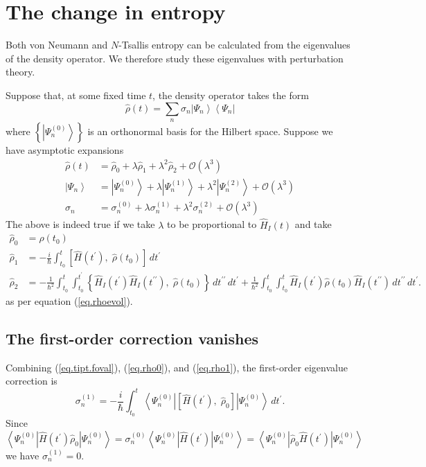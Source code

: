 \documentclass[11pt]{article}
\newcommand{\Od}[1]{\mathcal{O}{\left(#1\right)}}
\newcommand{\bra}[1]{\left\langle#1\right|}
\newcommand{\ket}[1]{\left|#1\right\rangle}
\newcommand{\op}[1]{\hat{#1}}
\theoremstyle{theorem}
\theoremstyle{remark}
\theoremstyle{step}
\theoremstyle{gap}
\begin{document}
\section{The change in entropy}

Both von Neumann and \(N\)-Tsallis entropy can be calculated from the eigenvalues of the density operator. We therefore study these eigenvalues with perturbation theory.

Suppose that, at some fixed time \(t\), the density operator takes the form
\begin{equation}\label{eq.densdecomp}
\op{\rho}(t) = \sum_n \sigma_n \ket{\Psi_n}\bra{\Psi_n}
\end{equation}
where \(\left\{\ket{\Psi_n^{(0)}}\right\}\) is an orthonormal basis for the Hilbert space.
Suppose we have asymptotic expansions
\begin{align*}
\op{\rho}(t) &= \op{\rho}_0 + \lambda \op{\rho}_1 + \lambda^2 \op{\rho}_2 + \Od{\lambda^3} \\
\ket{\Psi_n} &= \ket{\Psi_n^{(0)}} + \lambda \ket{\Psi_n^{(1)}} + \lambda^2 \ket{\Psi_n^{(2)}} + \Od{\lambda^3} \\
\sigma_n &= \sigma_n^{(0)} + \lambda \sigma_n^{(1)} + \lambda^2 \sigma_n^{(2)} + \Od{\lambda^3}
\end{align*}
The above is indeed true if we take \(\lambda\) to be proportional to \(\op{H}_I(t)\) and take
\begin{align}
\label{eq.rho0}\op{\rho}_0 &= \op{\rho}\left(t_0\right) \\
\label{eq.rho1}\op{\rho}_1 &= -\frac{i}{\hbar} \int_{t_0}^t \left[\op{H}(t^\prime),\; \op{\rho}(t_0) \right] \,dt^\prime\\
\label{eq.rho2}\op{\rho}_2 &= - \frac{1}{\hbar^2} \int_{t_0}^t \int_{t_0}^{t^\prime} \left\{ \op{H}_I (t^\prime) \op{H}_I(t^{\prime\prime}),\; \op{\rho}(t_0) \right\}\,dt^{\prime\prime}\,dt^\prime 
+ \frac{1}{\hbar^2} \int_{t_0}^t \int_{t_0}^{t} \op{H}_I (t^\prime) \op{\rho}(t_0) \op{H}_I (t^{\prime\prime})\,dt^{\prime\prime}\,dt^\prime.
\end{align}
as per equation (\ref{eq.rhoevol}).

\subsection{The first-order correction vanishes}

Combining (\ref{eq.tipt.foval}), (\ref{eq.rho0}), and (\ref{eq.rho1}), the first-order eigenvalue correction is
\[
\sigma_n^{(1)} = -\frac{i}{\hbar} \int_{t_0}^t \bra{\Psi_n^{(0)}} \left[\op{H}(t^\prime),\; \op{\rho}_0 \right] \ket{\Psi_n^{(0)}}\,dt^\prime.
\]
Since
\[
\bra{\Psi_n^{(0)}} \op{H}(t^\prime) \op{\rho}_0 \ket{\Psi_n^{(0)}} = 
\sigma_n^{(0)} \bra{\Psi_n^{(0)}} \op{H}(t^\prime) \ket{\Psi_n^{(0)}} =
\bra{\Psi_n^{(0)}} \op{\rho}_0 \op{H}(t^\prime) \ket{\Psi_n^{(0)}}
\]
we have \(\sigma_n^{(1)} = 0\).
\end{document}
